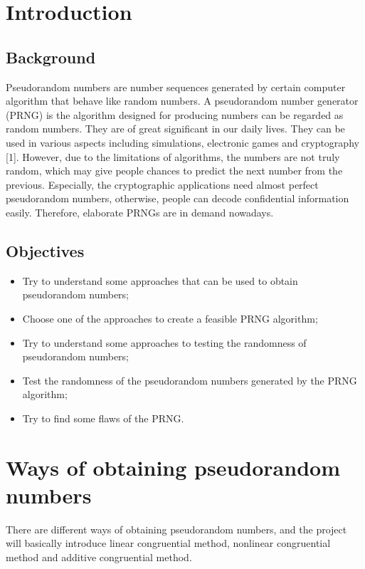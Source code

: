 \documentclass[a4paper]{article}
\begin{document}
\newpage

\tableofcontents

\newpage

\section{Introduction}
	\subsection{Background}
	Pseudorandom numbers are number sequences generated by certain computer algorithm that behave like random numbers. A pseudorandom number generator (PRNG) is the algorithm designed for producing numbers can be regarded as random numbers. They are of great significant in our daily lives. They can be used in various aspects including simulations, electronic games and cryptography [1]. However, due to the limitations of algorithms, the numbers are not truly random, which may give people chances to predict the next number from the previous. Especially, the cryptographic applications need  almost perfect pseudorandom numbers, otherwise, people can decode confidential information easily. Therefore, elaborate PRNGs are in demand nowadays.

	\subsection{Objectives}
	\begin{itemize}
	\item Try to understand some approaches that can be used to obtain pseudorandom numbers;
	\item Choose one of the approaches to create a feasible PRNG algorithm;
	\item Try to understand some approaches to testing the randomness of pseudorandom numbers;
	\item Test the randomness of the pseudorandom numbers generated by the PRNG algorithm;
	\item Try to find some flaws of the PRNG.
	\end{itemize}


\section{Ways of obtaining pseudorandom numbers}
	There are different ways of obtaining pseudorandom numbers, and the project will basically introduce linear congruential method, nonlinear congruential method and additive congruential method.
\end{document}
